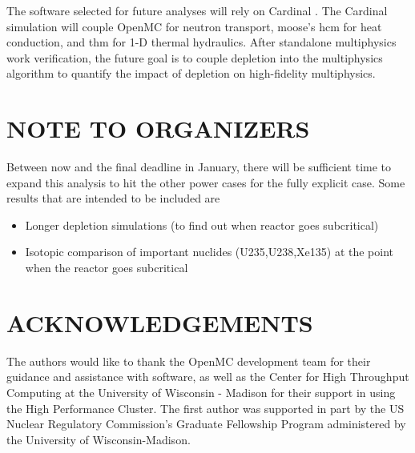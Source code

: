 \documentclass[letterpaper]{physor2024}
\begin{document}
The software selected for future analyses will rely on Cardinal \cite{novak2022-cardinal}. The Cardinal simulation will couple OpenMC for neutron transport, \gls{moose}'s \gls{hcm} for heat conduction, and \gls{thm} for 1-D thermal hydraulics. After standalone multiphysics work verification, the future goal is to couple depletion into the multiphysics algorithm to quantify the impact of depletion on high-fidelity multiphysics.

\section*{NOTE TO ORGANIZERS}
Between now and the final deadline in January, there will be sufficient time to expand this analysis to hit the other power cases for the fully explicit case. Some results that are intended to be included are
\begin{itemize}
    \item Longer depletion simulations (to find out when reactor goes subcritical)
    \item Isotopic comparison of important nuclides (U235,U238,Xe135) at the point when the reactor goes subcritical
\end{itemize}

\section*{ACKNOWLEDGEMENTS}
The authors would like to thank the OpenMC development team for their guidance and assistance with software, as well as the Center for High Throughput Computing at the University of Wisconsin - Madison for their support in using the High Performance Cluster. The first author was supported in part by the US Nuclear Regulatory Commission's Graduate Fellowship Program administered by the University of Wisconsin-Madison.




\end{document}
